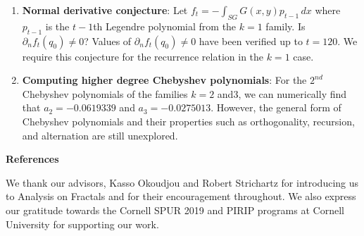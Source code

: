 \documentclass[a0, landscape]{a0poster}
\begin{document}
{\begin{textblock*}{10.75in}
\begin{minipage}{10.75in}
\begin{enumerate}
     $$ \left|I_n^m(f) - \int_{SG}f\right|\leq c_1(n)5^{-(n+1)m}\|\Delta^{(n+1)}f\|_\infty$$
        \item \textbf{Normal derivative conjecture}: Let $f_t = -\int_{SG}G(x,y)p_{t-1}\,dx$ where $p_{t-1}$ is the $t-1$th Legendre polynomial from the $k=1$ family. Is $\partial_{n}f_{t}(q_0) \neq 0$? Values of $\partial_{n}f_{t}(q_0) \neq 0$ have been verified up to $t=120$. We require this conjecture for the recurrence relation in the $k=1$ case. 
       \item \textbf{Computing higher degree Chebyshev polynomials}: For the $2^{nd}$ Chebyshev polynomials of the families $k=2$ and$ 3$, we can numerically find that $a_{2} = −0.0619339$ and $a_{3} = −0.0275013$. However, the general form of Chebyshev polynomials and their properties such as orthogonality, recursion, and alternation are still unexplored. \nocite{*}
\end{enumerate}         
        \vspace{1cm}
        \begin{center}
            {\LARGE \textcolor{CornellRed}{\textbf{References}}}
        \end{center}
        \vspace{1cm}
        
        
      \vspace{1cm}
        We thank our advisors, Kasso Okoudjou and Robert Strichartz for introducing us to Analysis on Fractals and for their encouragement throughout. We also express our gratitude towards the Cornell SPUR 2019 and PIRIP programs at Cornell University for supporting our work. 
  \end{minipage}%
  \end{textblock*}%
}


   
\end{document}
